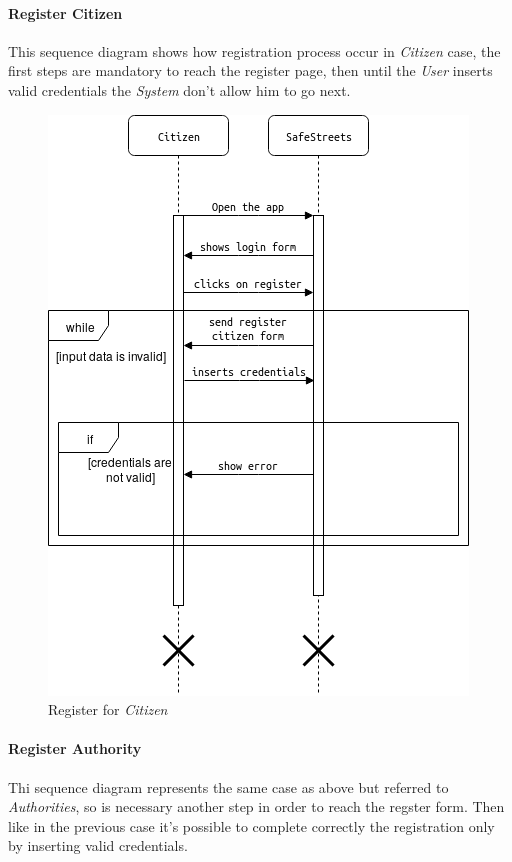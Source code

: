 \documentclass{article}
\begin{document}
\paragraph{Register Citizen}
This sequence diagram shows how registration process occur in \textit{Citizen} case, the first steps are mandatory to reach
the register page, then until the \textit{User} inserts valid credentials the \textit{System} don't allow him to go next.  
\begin{figure}[H]
    \centering
    \includegraphics[scale=0.5]{img/sequence_diagrams/register_citizen.png}
    \caption{Register for \textit{Citizen}}
\end{figure}

\clearpage

\paragraph{Register Authority}
Thi sequence diagram represents the same case as above but referred to \textit{Authorities}, so is necessary another
step in order to reach the regster form. Then like in the previous case it's possible to complete correctly the registration
only by inserting valid credentials.
\end{document}
